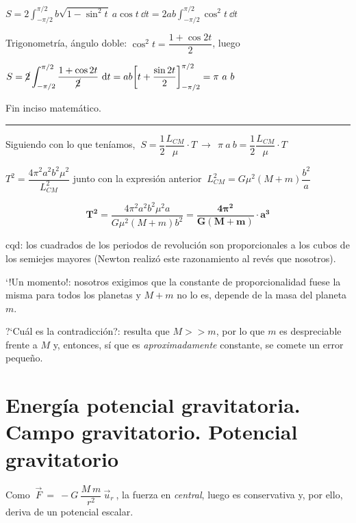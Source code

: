$\displaystyle S = 2 \int_{-\pi/2}^{\pi/2} b \sqrt{1-\sin^2 t}\ a \cos t\ \dd t=2ab\int_{-\pi/2}^{\pi/2} \cos^2 t\ \dd t$

Trigonometría, ángulo doble: $	\cos^2 t =\dfrac{1+\cos 2t}{2}$, luego

$\displaystyle S=\cancel{2} \int_{-\pi/2}^{\pi/2} \dfrac{1+\cos 2t}{\cancel{2}}\ \dd t = ab {\left[ t+\dfrac {\sin 2t}{2} \right]}_{-\pi/2}^{\pi/2} =\pi \ a \ b$

\textcolor{gris}{ Fin inciso matemático. \hspace{5mm} \rule{67mm}{0.4pt} }
\vspace{3mm} %

Siguiendo con lo que teníamos, $\ \displaystyle  S= \dfrac 1 2 \dfrac{L_{CM}}{\mu}\cdot T \  \to \ \ \pi \ a \ b = \dfrac 1 2 \dfrac{L_{CM}}{\mu}\cdot T$

$T^2 = \dfrac{4 \pi^2 a^2 b^2 \mu^2}{L^2_{CM}} $ junto con la expresión anterior $\ L^2_{CM}=G\mu^2 (M+m) \dfrac {b^2}{a}$

\begin{equation}
\boldsymbol{ T^2 } = \dfrac{4 \pi^2 a^2 b^2 \mu^2 a}{G \mu^2 (M+m) b^2} =  \boldsymbol{ \dfrac {4\pi^2}{G(M+m)} \cdot a^3 }
\end{equation}

cqd: los cuadrados de los periodos de revolución son proporcionales a los cubos de los semiejes mayores (Newton realizó este razonamiento al revés que nosotros).

`!Un momento!: nosotros exigimos que la constante de proporcionalidad fuese la misma para todos los planetas y $M+m$ no lo es, depende de la masa del planeta $m$.

?`Cuál es la contradicción?: resulta que $M>>m$, por lo que $m$ es despreciable frente a $M$ y, entonces, sí que es \emph{aproximadamente} constante, se comete un error pequeño.

\section[Energía potencial gravitatoria. Campo gravitatorio. Potencial gravitatorio]{Energía potencial gravitatoria. Campo gravitatorio. Potencial gravitatorio}

Como $\ \overrightarrow  F \ = \ - G\ \dfrac {M\ m}{r^2} \ \vec u_r \ $, la fuerza en \emph{central}, luego es conservativa y, por ello, deriva de un potencial escalar.


